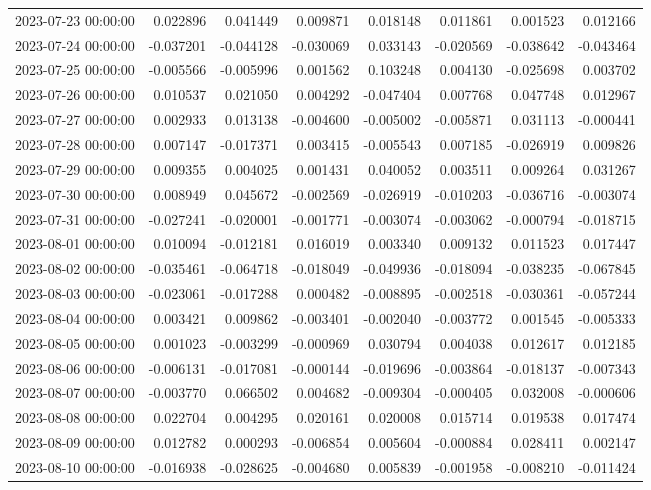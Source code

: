 \begin{tabular}{lrrrrrrr}
2023-07-23 00:00:00 & 0.022896 & 0.041449 & 0.009871 & 0.018148 & 0.011861 & 0.001523 & 0.012166 \\
2023-07-24 00:00:00 & -0.037201 & -0.044128 & -0.030069 & 0.033143 & -0.020569 & -0.038642 & -0.043464 \\
2023-07-25 00:00:00 & -0.005566 & -0.005996 & 0.001562 & 0.103248 & 0.004130 & -0.025698 & 0.003702 \\
2023-07-26 00:00:00 & 0.010537 & 0.021050 & 0.004292 & -0.047404 & 0.007768 & 0.047748 & 0.012967 \\
2023-07-27 00:00:00 & 0.002933 & 0.013138 & -0.004600 & -0.005002 & -0.005871 & 0.031113 & -0.000441 \\
2023-07-28 00:00:00 & 0.007147 & -0.017371 & 0.003415 & -0.005543 & 0.007185 & -0.026919 & 0.009826 \\
2023-07-29 00:00:00 & 0.009355 & 0.004025 & 0.001431 & 0.040052 & 0.003511 & 0.009264 & 0.031267 \\
2023-07-30 00:00:00 & 0.008949 & 0.045672 & -0.002569 & -0.026919 & -0.010203 & -0.036716 & -0.003074 \\
2023-07-31 00:00:00 & -0.027241 & -0.020001 & -0.001771 & -0.003074 & -0.003062 & -0.000794 & -0.018715 \\
2023-08-01 00:00:00 & 0.010094 & -0.012181 & 0.016019 & 0.003340 & 0.009132 & 0.011523 & 0.017447 \\
2023-08-02 00:00:00 & -0.035461 & -0.064718 & -0.018049 & -0.049936 & -0.018094 & -0.038235 & -0.067845 \\
2023-08-03 00:00:00 & -0.023061 & -0.017288 & 0.000482 & -0.008895 & -0.002518 & -0.030361 & -0.057244 \\
2023-08-04 00:00:00 & 0.003421 & 0.009862 & -0.003401 & -0.002040 & -0.003772 & 0.001545 & -0.005333 \\
2023-08-05 00:00:00 & 0.001023 & -0.003299 & -0.000969 & 0.030794 & 0.004038 & 0.012617 & 0.012185 \\
2023-08-06 00:00:00 & -0.006131 & -0.017081 & -0.000144 & -0.019696 & -0.003864 & -0.018137 & -0.007343 \\
2023-08-07 00:00:00 & -0.003770 & 0.066502 & 0.004682 & -0.009304 & -0.000405 & 0.032008 & -0.000606 \\
2023-08-08 00:00:00 & 0.022704 & 0.004295 & 0.020161 & 0.020008 & 0.015714 & 0.019538 & 0.017474 \\
2023-08-09 00:00:00 & 0.012782 & 0.000293 & -0.006854 & 0.005604 & -0.000884 & 0.028411 & 0.002147 \\
2023-08-10 00:00:00 & -0.016938 & -0.028625 & -0.004680 & 0.005839 & -0.001958 & -0.008210 & -0.011424 \\

\end{tabular}
